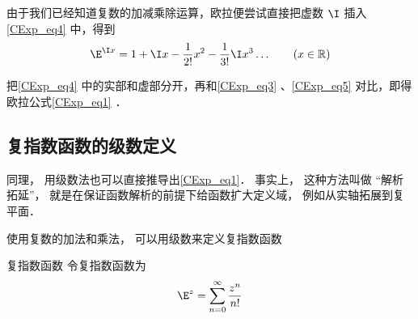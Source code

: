 由于我们已经知道复数的加减乘除运算，欧拉便尝试直接把虚数 $\I$ 插入\autoref{CExp_eq4}  中，得到
\begin{equation}\label{CExp_eq4}
\E^{\I x} =1 + \I x - \frac{1}{2!} x^2 - \frac{1}{3!} \I x^3  \ldots
\qquad (x \in \mathbb R)
\end{equation}

把\autoref{CExp_eq4} 中的实部和虚部分开，再和\autoref{CExp_eq3} 、\autoref{CExp_eq5} 对比，即得欧拉公式\autoref{CExp_eq1} ．

\subsection{复指数函数的级数定义}
同理， 用级数法也可以直接推导出\autoref{CExp_eq1}． 事实上， 这种方法叫做 “解析拓延”， 就是在保证函数解析的前提下给函数扩大定义域， 例如从实轴拓展到复平面．

使用复数的加法和乘法， 可以用级数来定义复指数函数
\begin{definition}{复指数函数}
令复指数函数为
\begin{equation}
\E^z = \sum_{n=0}^\infty \frac{z^n}{n!}
\end{equation}
\end{definition}
